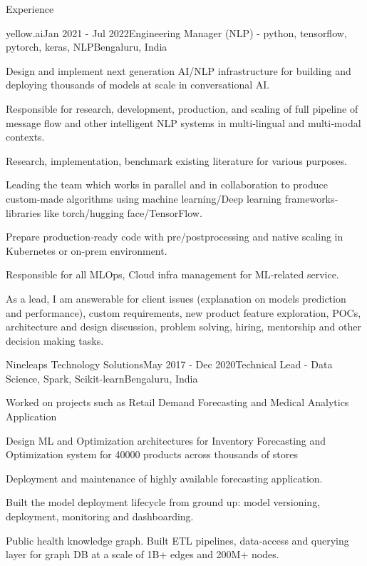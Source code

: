 \documentclass{resume}
\begin{document}
\begin{rSection}{Experience}
    \begin{rSubsection}{yellow.ai}{Jan 2021 - Jul 2022}{Engineering Manager (NLP) - python, tensorflow, pytorch, keras, NLP}{Bengaluru, India}
    \item Design and implement next generation AI/NLP infrastructure for building and deploying thousands of models at scale in conversational AI.
    \item Responsible for research, development, production, and scaling of full pipeline of message flow and other intelligent NLP systems in multi‐lingual and multi‐modal contexts.
    \item Research, implementation, benchmark existing literature for various purposes.
    \item Leading the team which works in parallel and in collaboration to produce custom‐made algorithms using machine learning/Deep learning frameworks‐libraries like torch/hugging face/TensorFlow.
    \item Prepare production‐ready code with pre/postprocessing and native scaling in Kubernetes or on‐prem environment.
    \item Responsible for all MLOps, Cloud infra management for ML‐related service.
    \item As a lead, I am answerable for client issues (explanation on models prediction and performance), custom requirements, new product feature exploration, POCs, architecture and design discussion, problem solving, hiring, mentorship and other decision making tasks.
    \end{rSubsection}
  
    \begin{rSubsection}{Nineleaps Technology Solutions}{May 2017 - Dec 2020}{Technical Lead - Data Science, Spark, Scikit-learn}{Bengaluru, India}
    \item Worked on projects such as Retail Demand Forecasting and Medical Analytics Application
    \item Design ML and Optimization architectures for Inventory Forecasting and Optimization system for 40000 products across thousands of stores
    \item Deployment and maintenance of highly available forecasting application.
    \item Built the model deployment lifecycle from ground up: model versioning, deployment, monitoring and dashboarding.
    \item Public health knowledge graph. Built ETL pipelines, data‐access and querying layer for graph DB at a scale of 1B+ edges and 200M+ nodes.
    \end{rSubsection}


\end{rSection}
\end{document}
